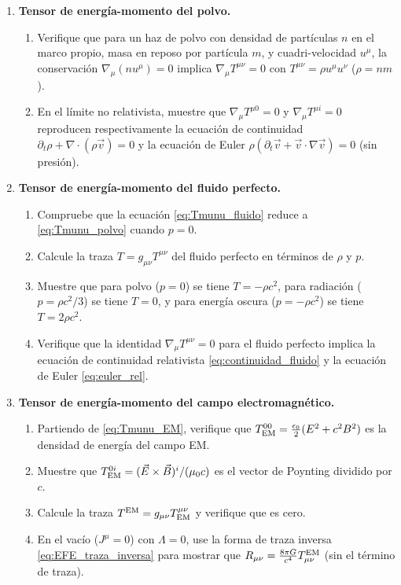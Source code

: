 \begin{enumerate}[leftmargin=2em, label=\textbf{P\thechapter.\arabic*.}]

  \item \textbf{Tensor de energía-momento del polvo.}
  \begin{enumerate}[label=(\alph*)]
    \item Verifique que para un haz de polvo con densidad de partículas $n$ en el marco propio, masa en reposo por partícula $m$, y cuadri-velocidad $u^\mu$, la conservación $\nabla_\mu(n u^\mu) = 0$ implica $\nabla_\mu T^{\mu\nu} = 0$ con $T^{\mu\nu} = \rho u^\mu u^\nu$ ($\rho = nm$).
    \item En el límite no relativista, muestre que $\nabla_\mu T^{\mu 0} = 0$ y $\nabla_\mu T^{\mu i} = 0$ reproducen respectivamente la ecuación de continuidad $\partial_t\rho + \nabla\cdot(\rho\vec{v}) = 0$ y la ecuación de Euler $\rho(\partial_t\vec{v} + \vec{v}\cdot\nabla\vec{v}) = 0$ (sin presión).
  \end{enumerate}

  \item \textbf{Tensor de energía-momento del fluido perfecto.}
  \begin{enumerate}[label=(\alph*)]
    \item Compruebe que la ecuación \eqref{eq:Tmunu_fluido} reduce a \eqref{eq:Tmunu_polvo} cuando $p = 0$.
    \item Calcule la traza $T = g_{\mu\nu}T^{\mu\nu}$ del fluido perfecto en términos de $\rho$ y $p$.
    \item Muestre que para polvo ($p = 0$) se tiene $T = -\rho c^2$, para radiación ($p = \rho c^2/3$) se tiene $T = 0$, y para energía oscura ($p = -\rho c^2$) se tiene $T = 2\rho c^2$.
    \item Verifique que la identidad $\nabla_\mu T^{\mu\nu} = 0$ para el fluido perfecto implica la ecuación de continuidad relativista \eqref{eq:continuidad_fluido} y la ecuación de Euler \eqref{eq:euler_rel}.
  \end{enumerate}

  \item \textbf{Tensor de energía-momento del campo electromagnético.}
  \begin{enumerate}[label=(\alph*)]
    \item Partiendo de \eqref{eq:Tmunu_EM}, verifique que $T^{00}_{\rm EM} = \frac{\epsilon_0}{2}(E^2 + c^2 B^2)$ es la densidad de energía del campo EM.
    \item Muestre que $T^{0i}_{\rm EM} = (\vec{E}\times\vec{B})^i/(\mu_0 c)$ es el vector de Poynting dividido por $c$.
    \item Calcule la traza $T^{\rm EM} = g_{\mu\nu}T^{\mu\nu}_{\rm EM}$ y verifique que es cero.
    \item En el vacío ($J^\mu = 0$) con $\Lambda = 0$, use la forma de traza inversa \eqref{eq:EFE_traza_inversa} para mostrar que $R_{\mu\nu} = \frac{8\pi G}{c^4}T_{\mu\nu}^{\rm EM}$ (sin el término de traza).
  \end{enumerate}


\end{enumerate}
